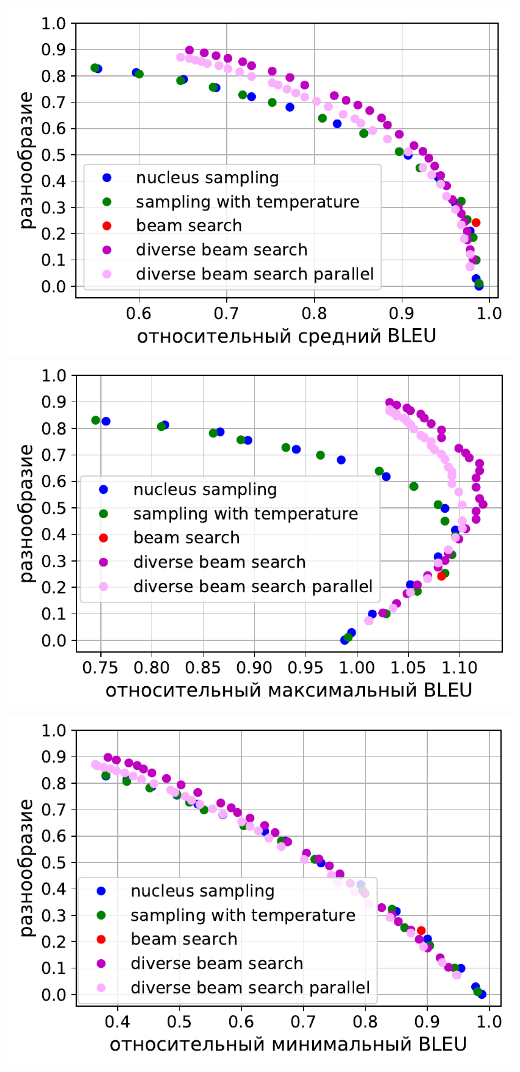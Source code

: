 \documentclass[unicode]{beamer}
\begin{document}
\begin{frame}
\begin{center}
\includegraphics[scale=0.25]{avg-bleu-diverse-beam-search.pdf}
\includegraphics[scale=0.25]{max-bleu-diverse-beam-search.pdf}
\includegraphics[scale=0.25]{min-bleu-diverse-beam-search.pdf}
\end{center}

\end{frame}
\end{document}
